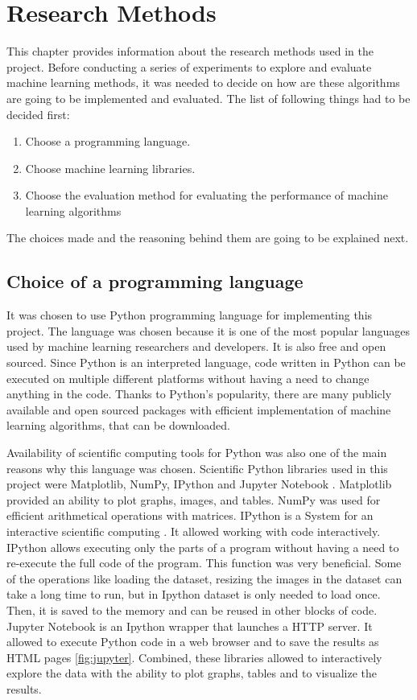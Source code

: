 \chapter{Research Methods}

This chapter provides information about the research methods used in the project. Before conducting a series of experiments to explore and evaluate machine learning methods, it was needed to decide on how are these algorithms are going to be implemented and evaluated. The list of following things had to be decided first: \begin{enumerate}
  \item Choose a programming language.
  \item Choose machine learning libraries.
  \item Choose the evaluation method for evaluating the performance of machine learning algorithms
\end{enumerate}The choices made and the reasoning behind them are going to be explained next.

\section{Choice of a programming language}

 It was chosen to use Python programming language for implementing this project. The language was chosen because it is one of the most popular languages used by machine learning researchers and developers. It is also free and open sourced. Since Python is an interpreted language, code written in Python can be executed on multiple different platforms without having a need to change anything in the code. Thanks to Python's popularity, there are many publicly available and open sourced packages with efficient implementation of machine learning algorithms, that can be downloaded.

Availability of scientific computing tools for Python was also one of the main reasons why this language was chosen. Scientific Python libraries used in this project were Matplotlib, NumPy, IPython and Jupyter Notebook \citep{scipy}. Matplotlib provided an ability to plot graphs, images, and tables. NumPy was used for efficient arithmetical operations with matrices. IPython is a System for an interactive scientific computing \citep{ipython}. It allowed working with code interactively. IPython allows executing only the parts of a program without having a need to re-execute the full code of the program. This function was very beneficial. Some of the operations like loading the dataset, resizing the images in the dataset can take a long time to run, but in Ipython dataset is only needed to load once. Then, it is saved to the memory and can be reused in other blocks of code. Jupyter Notebook is an Ipython wrapper that launches a HTTP server. It allowed to execute Python code in a web browser and to save the results as HTML pages \autoref{fig:jupyter}. Combined, these libraries allowed to interactively explore the data with the ability to plot graphs, tables and to visualize the results.

